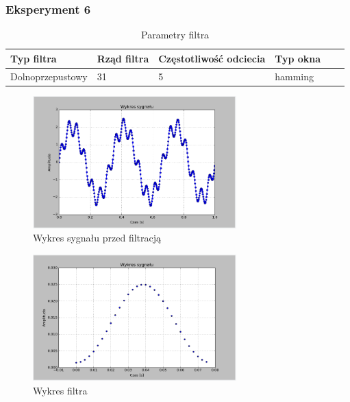 \documentclass{article}
\begin{document}
{        \subsubsection{Eksperyment 6} {
            \begin{table}[h!]
            \centering
            \begin{tabular}{|l|l|l|l|l|l|}
            \hline
            Typ filtra & Rząd filtra & Częstotliwość odciecia & Typ okna  \\\hline
            Dolnoprzepustowy & 31 & 5 & hamming     \\\hline
            \end{tabular}
            \caption{Parametry filtra}
            \end{table}
            \begin{figure}[h!]
                \centering
                \includegraphics[width=0.7\textwidth]{img/sig.png}
                \caption{Wykres sygnału przed filtracją}
            \end{figure}
            \begin{figure}[h!]
                \centering
                \includegraphics[width=0.7\textwidth]{img/fil11.png}
                \caption{Wykres filtra}
            \end{figure}

}}
\end{document}
